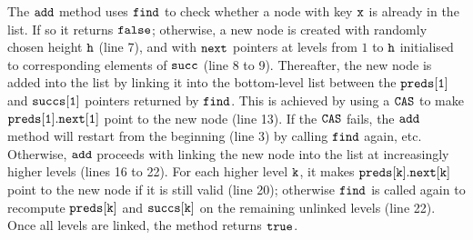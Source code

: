 
The $\tt add$ method uses $\tt find$ to check whether a node with key $\tt x$ is already in the list. If so it returns $\tt false$; otherwise, a new node is created with randomly chosen height $\tt h$ (line 7), and with $\tt next$ pointers at levels from $1$ to $\tt h$  initialised to corresponding elements of $\tt succ$ (line 8 to 9). Thereafter, the new node is added into the list by linking it into the bottom-level list between the $\tt preds[1]$ and $\tt succs[1]$ pointers returned by $\tt find$. This is achieved by using a $\tt CAS$ to make $\tt preds[1].next[1]$ point to the new node (line 13). If the $\tt CAS$ fails, the $\tt add$ method will restart from the beginning (line 3) by calling $\tt find$ again, etc. Otherwise, $\tt add$ proceeds with linking the new node into the list at increasingly higher levels (lines 16 to 22). For each higher level ${\tt k}$, it makes $\tt preds[k].next[k]$ point to the new node if it is still valid (line 20); otherwise
$\tt find$ is called again to recompute $\tt preds[k]$ and $\tt succs[k]$ on the remaining unlinked levels (line 22). Once all levels are linked, the method returns $\tt true$.

 

